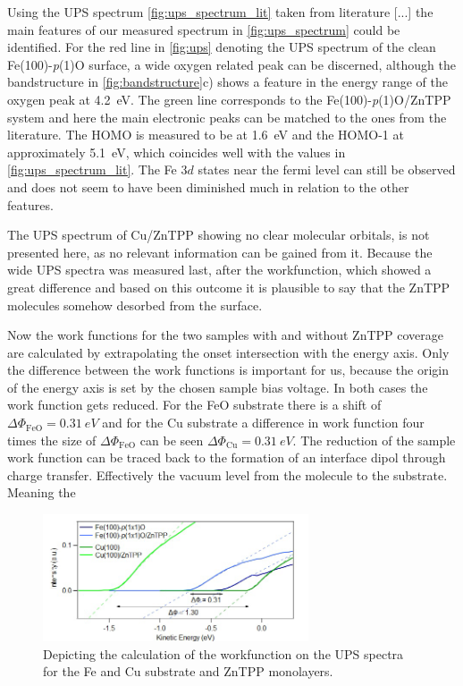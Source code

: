 \FloatBarrier
Using the UPS spectrum \autoref{fig:ups_spectrum_lit} taken from literature [...] the main features of our measured spectrum in \autoref{fig:ups_spectrum} could be identified.
For the red line in \autoref{fig:ups} denoting the UPS spectrum of the clean Fe(100)-\textit{p}(1)O surface, a wide oxygen related peak can be discerned, although the bandstructure in \autoref{fig:bandstructure}c) shows a feature in the energy range of the oxygen peak at \qty{4.2}{eV}.
The green line corresponds to the Fe(100)-\textit{p}(1)O/ZnTPP system and here the main electronic peaks can be matched to the ones from the literature.
The HOMO is measured to be at \qty{1.6}{eV} and the HOMO-1 at approximately \qty{5.1}{eV}, which coincides well with the values in \autoref{fig:ups_spectrum_lit}.
The Fe $3d$ states near the fermi level can still be observed and does not seem to have been diminished much in relation to the other features.

The UPS spectrum of Cu/ZnTPP showing no clear molecular orbitals, is not presented here, as no relevant information can be gained from it.
Because the wide UPS spectra was measured last, after the workfunction, which showed a great difference and based on this outcome it is plausible to say that the ZnTPP molecules somehow desorbed from the surface.

Now the work functions for the two samples with and without ZnTPP coverage are calculated by extrapolating the onset intersection with the energy axis. Only the difference between the work functions is important for us, because the origin of the energy axis is set by the chosen sample bias voltage.
In both cases the work function gets reduced. 
For the FeO substrate there is a shift of $\Delta\Phi_{\mathrm{FeO}} = \qty{0.31}{eV}$ and for the Cu substrate a difference in work function four times the size of $\Delta\Phi_{\mathrm{FeO}}$ can be seen $\Delta\Phi_{\mathrm{Cu}} = \qty{0.31}{eV}$.
The reduction of the sample work function can be traced back to the formation of an interface dipol through charge transfer.
Effectively the vacuum level  from the molecule to the substrate.
Meaning the 
\begin{figure}[h]
    \centering
    \includegraphics[width = 0.7\textwidth]{Plots/WF.png}
    \caption{Depicting the calculation of the workfunction on the UPS spectra for the Fe and Cu substrate and ZnTPP monolayers.}
    \label{fig:wf}
\end{figure}
\FloatBarrier

